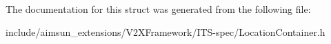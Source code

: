 The documentation for this struct was generated from the following file\+:\begin{DoxyCompactItemize}
\item 
include/aimsun\+\_\+extensions/\+V2\+X\+Framework/\+I\+T\+S-\/spec/Location\+Container.\+h\end{DoxyCompactItemize}
